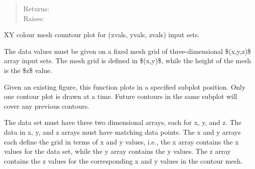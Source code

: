 \documentclass[a4paper,10pt,english]{sphinxmanual}
\begin{document}
\begin{fulllineitems}
\begin{fulllineitems}
\begin{quote}
\begin{description}
\item[{Returns:}] \leavevmode
{}

\item[{Raises:}] \leavevmode
{}

\end{description}
\end{quote}

\end{fulllineitems}


\begin{fulllineitems}
\label{ryplot:pyradi.ryplot.Plotter.meshContour}
XY colour mesh  countour plot for (xvals, yvals, zvals) input sets.

The data values must be given on a fixed mesh grid of three-dimensional 
\$(x,y,z)\$ array input sets. The mesh grid is defined in \$(x,y)\$, while the height 
of the mesh is the \$z\$ value.

Given an existing figure, this function plots in a specified subplot position. 
Only one contour plot is drawn at a time.  Future contours in the same subplot 
will cover any previous contours.

The data set must have three two dimensional arrays, each for x, y, and z.  
The data in x, y, and z arrays must have matching data points.  The x and y arrays each define the grid in terms of x and y values, i.e., the x array contains the x values for the data set, while the y array contains the y values.  The z array contains the z values for the corresponding x and y values in the contour mesh.


\end{fulllineitems}
\end{fulllineitems}
\end{document}
